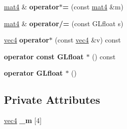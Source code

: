 \begin{DoxyCompactItemize}
\item 
\hypertarget{class_angel_1_1mat4_a36a1eca30d83a2bdbd7d2ec6675ee853}{\hyperlink{class_angel_1_1mat4}{mat4} \& {\bfseries operator$\ast$=} (const \hyperlink{class_angel_1_1mat4}{mat4} \&m)}\label{class_angel_1_1mat4_a36a1eca30d83a2bdbd7d2ec6675ee853}

\item 
\hypertarget{class_angel_1_1mat4_a0f8c1b50c454341ff26f006a0ff09788}{\hyperlink{class_angel_1_1mat4}{mat4} \& {\bfseries operator/=} (const \-G\-Lfloat s)}\label{class_angel_1_1mat4_a0f8c1b50c454341ff26f006a0ff09788}

\item 
\hypertarget{class_angel_1_1mat4_a820e0c317d1836cd224ff75f676c6f2f}{\hyperlink{struct_angel_1_1vec4}{vec4} {\bfseries operator$\ast$} (const \hyperlink{struct_angel_1_1vec4}{vec4} \&v) const }\label{class_angel_1_1mat4_a820e0c317d1836cd224ff75f676c6f2f}

\item 
\hypertarget{class_angel_1_1mat4_a93c2295529f8cde832378076837d202e}{{\bfseries operator const G\-Lfloat $\ast$} () const }\label{class_angel_1_1mat4_a93c2295529f8cde832378076837d202e}

\item 
\hypertarget{class_angel_1_1mat4_a83e8b31ac751f67e31985fc104e1a0e6}{{\bfseries operator G\-Lfloat $\ast$} ()}\label{class_angel_1_1mat4_a83e8b31ac751f67e31985fc104e1a0e6}

\end{DoxyCompactItemize}
\subsection*{\-Private \-Attributes}
\begin{DoxyCompactItemize}
\item 
\hypertarget{class_angel_1_1mat4_a927716d9eb0e35e6f577beca4a4fc243}{\hyperlink{struct_angel_1_1vec4}{vec4} {\bfseries \-\_\-m} \mbox{[}4\mbox{]}}\label{class_angel_1_1mat4_a927716d9eb0e35e6f577beca4a4fc243}

\end{DoxyCompactItemize}
